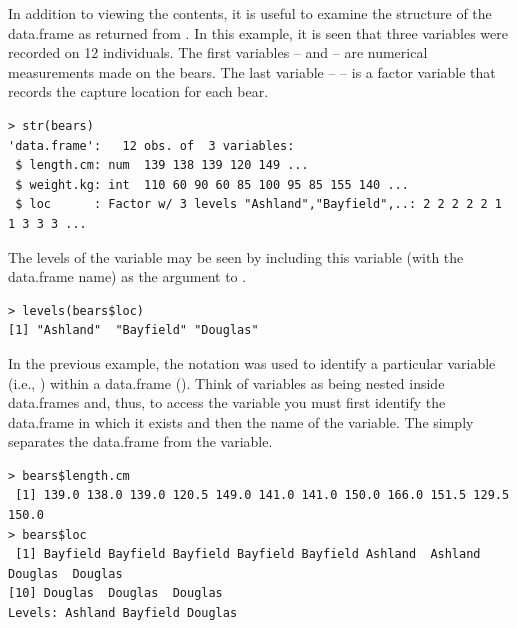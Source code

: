 \documentclass[10pt,openany]{book}\usepackage[]{graphicx}\usepackage[]{color}
\makeatletter
\newenvironment{kframe}{%
 \def\at@end@of@kframe{}%
 \ifinner\ifhmode%
  \def\at@end@of@kframe{\end{minipage}}%
  \begin{minipage}{\columnwidth}%
 \fi\fi%
 \def\FrameCommand##1{\hskip\@totalleftmargin \hskip-\fboxsep
 \colorbox{shadecolor}{##1}\hskip-\fboxsep
     \hskip-\linewidth \hskip-\@totalleftmargin \hskip\columnwidth}%
 \MakeFramed {\advance\hsize-\width
   \@totalleftmargin\z@ \linewidth\hsize
   \@setminipage}}%
 {\par\unskip\endMakeFramed%
 \at@end@of@kframe}
\newenvironment{knitrout}{}{} %
\makeatother
\begin{document}
In addition to viewing the contents, it is useful to examine the structure of the data.frame as returned from .  In this example, it is seen that three variables were recorded on 12 individuals.  The first variables --  and  -- are numerical measurements made on the bears.  The last variable --  -- is a factor variable that records the capture location for each bear.
\begin{knitrout}
\color{fgcolor}\begin{kframe}
\begin{verbatim}
> str(bears)
'data.frame':	12 obs. of  3 variables:
 $ length.cm: num  139 138 139 120 149 ...
 $ weight.kg: int  110 60 90 60 85 100 95 85 155 140 ...
 $ loc      : Factor w/ 3 levels "Ashland","Bayfield",..: 2 2 2 2 2 1 1 3 3 3 ...
\end{verbatim}
\end{kframe}
\end{knitrout}
The levels of the  variable may be seen by including this variable (with the data.frame name) as the argument to .
\begin{knitrout}
\color{fgcolor}\begin{kframe}
\begin{verbatim}
> levels(bears$loc)
[1] "Ashland"  "Bayfield" "Douglas" 
\end{verbatim}
\end{kframe}
\end{knitrout}

In the previous example, the \R{\$} notation was used to identify a particular variable (i.e., ) within a data.frame ().  Think of variables as being nested inside data.frames and, thus, to access the variable you must first identify the data.frame in which it exists and then the name of the variable.  The \R{\$} simply separates the data.frame from the variable.
\begin{knitrout}
\color{fgcolor}\begin{kframe}
\begin{verbatim}
> bears$length.cm
 [1] 139.0 138.0 139.0 120.5 149.0 141.0 141.0 150.0 166.0 151.5 129.5 150.0
> bears$loc
 [1] Bayfield Bayfield Bayfield Bayfield Bayfield Ashland  Ashland  Douglas  Douglas 
[10] Douglas  Douglas  Douglas 
Levels: Ashland Bayfield Douglas
\end{verbatim}
\end{kframe}
\end{knitrout}
\end{document}

